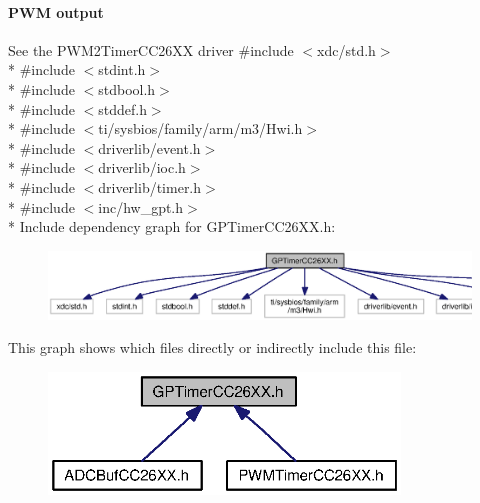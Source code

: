 \paragraph*{P\+W\+M output}

See the P\+W\+M2\+Timer\+C\+C26\+X\+X driver {\ttfamily \#include $<$xdc/std.\+h$>$}\\*
{\ttfamily \#include $<$stdint.\+h$>$}\\*
{\ttfamily \#include $<$stdbool.\+h$>$}\\*
{\ttfamily \#include $<$stddef.\+h$>$}\\*
{\ttfamily \#include $<$ti/sysbios/family/arm/m3/\+Hwi.\+h$>$}\\*
{\ttfamily \#include $<$driverlib/event.\+h$>$}\\*
{\ttfamily \#include $<$driverlib/ioc.\+h$>$}\\*
{\ttfamily \#include $<$driverlib/timer.\+h$>$}\\*
{\ttfamily \#include $<$inc/hw\+\_\+gpt.\+h$>$}\\*
Include dependency graph for G\+P\+Timer\+C\+C26\+X\+X.\+h\+:
\nopagebreak
\begin{figure}[H]
\begin{center}
\leavevmode
\includegraphics[width=350pt]{_g_p_timer_c_c26_x_x_8h__incl}
\end{center}
\end{figure}
This graph shows which files directly or indirectly include this file\+:
\nopagebreak
\begin{figure}[H]
\begin{center}
\leavevmode
\includegraphics[width=265pt]{_g_p_timer_c_c26_x_x_8h__dep__incl}
\end{center}
\end{figure}
